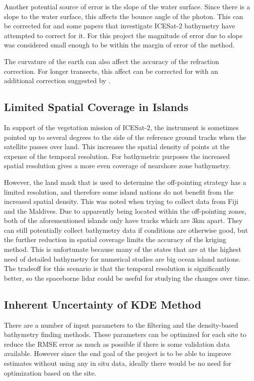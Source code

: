 Another potential source of error is the slope of the water surface. Since there is a slope to the water surface, this affects the bounce angle of the photon. This can be corrected for and some papers that investigate ICESat-2 bathymetry have attempted to correct for it. For this project the magnitude of error due to slope was considered small enough to be within the margin of error of the method.

The curvature of the earth can also affect the accuracy of the refraction correction. For longer transects, this affect can be corrected for with an additional correction suggested by \citeauthor{Parrish2019}. 

\subsection{Limited Spatial Coverage in Islands}

In support of the vegetation mission of ICESat-2, the instrument is sometimes pointed up to several degrees to the side of the reference ground tracks when the satellite passes over land. This increases the spatial density of points at the expense of the temporal resolution. For bathymetric purposes the increased spatial resolution gives a more even  coverage of nearshore zone bathymetry. 

However, the land mask that is used to determine the off-pointing strategy has a limited resolution, and therefore some island nations do not benefit from the increased spatial density. This was noted when trying to collect data from Fiji and the Maldives. Due to apparently being located within the off-pointing zones, both of the aforementioned islands only have tracks which are 3km apart. They can still potentially collect bathymetry data if conditions are otherwise good, but the further reduction in spatial coverage limits the accuracy of the kriging method. This is unfortunate because many of the states that are at the highest need of detailed bathymetry for numerical studies are big ocean island nations. The tradeoff for this scenario is that the temporal resolution is significantly better, so the spaceborne lidar could be useful for studying the changes over time. 

\subsection{Inherent Uncertainty of KDE Method}
There are a number of input parameters to the filtering and the density-based bathymetry finding methods. These parameters can be optimized for each site to reduce the RMSE error as much as possible if there is some validation data available. However since the end goal of the project is to be able to improve estimates without using any in situ data, ideally there would be no need for optimization based on the site.

